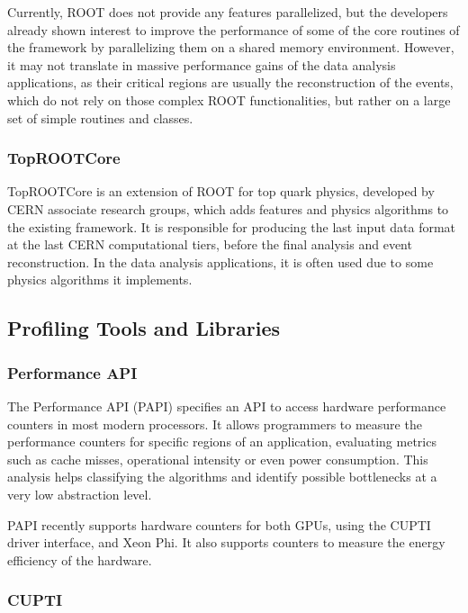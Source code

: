 Currently, ROOT does not provide any features parallelized, but the developers already shown interest to improve the performance of some of the core routines of the framework by parallelizing them on a shared memory environment. However, it may not translate in massive performance gains of the data analysis applications, as their critical regions are usually the reconstruction of the events, which do not rely on those complex ROOT functionalities, but rather on a large set of simple routines and classes.

\subsubsection*{TopROOTCore}

TopROOTCore is an extension of ROOT for top quark physics, developed by CERN associate research groups, which adds features and physics algorithms to the existing framework. It is responsible for producing the last input data format at the last CERN computational tiers, before the final analysis and event reconstruction. In the data analysis applications, it is often used due to some physics algorithms it implements.

\subsection{Profiling Tools and Libraries}
\label{tools}

\subsubsection*{Performance API}

The Performance API (PAPI) \cite{PAPI} specifies an API to access hardware performance counters in most modern processors. It allows programmers to measure the performance counters for specific regions of an application, evaluating metrics such as cache misses, operational intensity or even power consumption. This analysis helps classifying the algorithms and identify possible bottlenecks at a very low abstraction level.

PAPI recently supports hardware counters for both \nvidia GPUs, using the \nvidia CUPTI driver interface, and \intel Xeon Phi. It also supports counters to measure the energy efficiency of the hardware.

\subsubsection*{\nvidia CUPTI}

